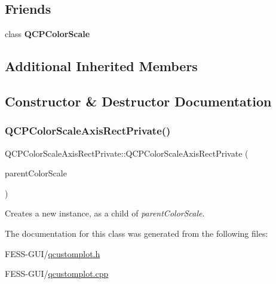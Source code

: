 \subsection*{Friends}
\begin{DoxyCompactItemize}
\item 
\hypertarget{class_q_c_p_color_scale_axis_rect_private_a60f6031408a325ebd1bbbad1ccf9b897}{}\label{class_q_c_p_color_scale_axis_rect_private_a60f6031408a325ebd1bbbad1ccf9b897} 
class {\bfseries Q\+C\+P\+Color\+Scale}
\end{DoxyCompactItemize}
\subsection*{Additional Inherited Members}


\subsection{Constructor \& Destructor Documentation}
\hypertarget{class_q_c_p_color_scale_axis_rect_private_ad3b242f75dd2b33581364a4e668a80db}{}\label{class_q_c_p_color_scale_axis_rect_private_ad3b242f75dd2b33581364a4e668a80db} 
\subsubsection{\texorpdfstring{Q\+C\+P\+Color\+Scale\+Axis\+Rect\+Private()}{QCPColorScaleAxisRectPrivate()}}
{\footnotesize\ttfamily Q\+C\+P\+Color\+Scale\+Axis\+Rect\+Private\+::\+Q\+C\+P\+Color\+Scale\+Axis\+Rect\+Private (\begin{DoxyParamCaption}\item[{\hyperlink{class_q_c_p_color_scale}{Q\+C\+P\+Color\+Scale} $\ast$}]{parent\+Color\+Scale }\end{DoxyParamCaption})\hspace{0.3cm}{\ttfamily [explicit]}}

Creates a new instance, as a child of {\itshape parent\+Color\+Scale}. 

The documentation for this class was generated from the following files\+:\begin{DoxyCompactItemize}
\item 
F\+E\+S\+S-\/\+G\+U\+I/\hyperlink{qcustomplot_8h}{qcustomplot.\+h}\item 
F\+E\+S\+S-\/\+G\+U\+I/\hyperlink{qcustomplot_8cpp}{qcustomplot.\+cpp}\end{DoxyCompactItemize}
